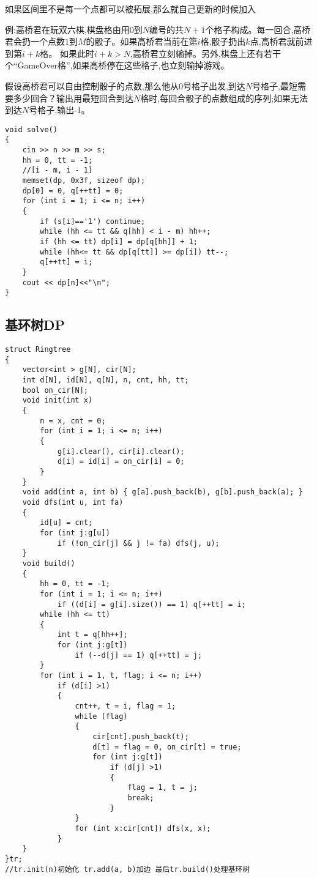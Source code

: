 \documentclass[a4paper, fontset=none]{ctexart}
\begin{document}
如果区间里不是每一个点都可以被拓展,那么就自己更新的时候加入

例:高桥君在玩双六棋,棋盘格由用$0$到$N$编号的共$N+1$个格子构成。每一回合,高桥君会扔一个点数$1$到$M$的骰子。如果高桥君当前在第$i$格,骰子扔出$k$点,高桥君就前进到第$i+k$格。 如果此时$i+k > N$,高桥君立刻输掉。另外,棋盘上还有若干个“GameOver格”,如果高桥停在这些格子,也立刻输掉游戏。

假设高桥君可以自由控制骰子的点数,那么他从$0$号格子出发,到达$N$号格子,最短需要多少回合？输出用最短回合到达$N$格时,每回合骰子的点数组成的序列;如果无法到达$N$号格子,输出-1。

\begin{verbatim}
void solve()
{
    cin >> n >> m >> s;
    hh = 0, tt = -1;
    //[i - m, i - 1]
    memset(dp, 0x3f, sizeof dp);
    dp[0] = 0, q[++tt] = 0;
    for (int i = 1; i <= n; i++)
    {
        if (s[i]=='1') continue;
        while (hh <= tt && q[hh] < i - m) hh++;
        if (hh <= tt) dp[i] = dp[q[hh]] + 1;
        while (hh<= tt && dp[q[tt]] >= dp[i]) tt--;
        q[++tt] = i;
    }
    cout << dp[n]<<"\n";
}
\end{verbatim}
\subsection{基环树DP}

\begin{verbatim}
struct Ringtree
{
    vector<int > g[N], cir[N];
    int d[N], id[N], q[N], n, cnt, hh, tt;
    bool on_cir[N];
    void init(int x)
    {
        n = x, cnt = 0;
        for (int i = 1; i <= n; i++)
        {
            g[i].clear(), cir[i].clear();
            d[i] = id[i] = on_cir[i] = 0;
        }
    }
    void add(int a, int b) { g[a].push_back(b), g[b].push_back(a); }
    void dfs(int u, int fa)
    {
        id[u] = cnt;
        for (int j:g[u])
            if (!on_cir[j] && j != fa) dfs(j, u);
    }
    void build()
    {
        hh = 0, tt = -1;
        for (int i = 1; i <= n; i++)
            if ((d[i] = g[i].size()) == 1) q[++tt] = i;
        while (hh <= tt)
        {
            int t = q[hh++];
            for (int j:g[t])
                if (--d[j] == 1) q[++tt] = j;
        }
        for (int i = 1, t, flag; i <= n; i++)
            if (d[i] >1)
            {
                cnt++, t = i, flag = 1;
                while (flag)
                {
                    cir[cnt].push_back(t);
                    d[t] = flag = 0, on_cir[t] = true;
                    for (int j:g[t])
                        if (d[j] >1)
                        {
                            flag = 1, t = j;
                            break;
                        }
                }
                for (int x:cir[cnt]) dfs(x, x);
            }
    }
}tr;
//tr.init(n)初始化 tr.add(a, b)加边 最后tr.build()处理基环树
\end{verbatim}
\end{document}

